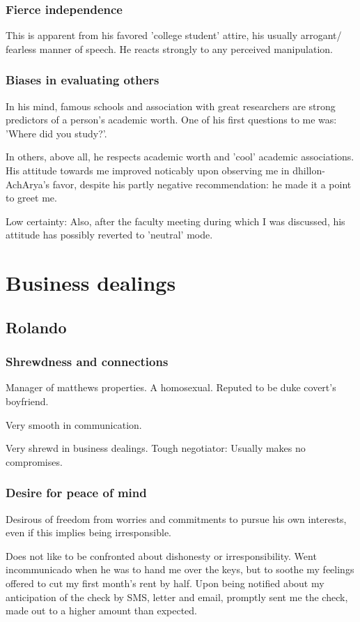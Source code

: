 \documentclass[oneside, article]{memoir}
\begin{document}
\section{Fierce independence}
This is apparent from his favored 'college student' attire, his usually arrogant/ fearless manner of speech. He reacts strongly to any perceived manipulation.

\section{Biases in evaluating others}
In his mind, famous schools and association with great researchers are strong predictors of a person's academic worth. One of his first questions to me was: 'Where did you study?'.

In others, above all, he respects academic worth and 'cool' academic associations. His attitude towards me improved noticably upon observing me in dhillon-AchArya's favor, despite his partly negative recommendation: he made it a point to greet me.

Low certainty: Also, after the faculty meeting during which I was discussed, his attitude has possibly reverted to 'neutral' mode.

\part{Business dealings}
\chapter{Rolando}
\section{Shrewdness and connections}
Manager of matthews properties. A homosexual. Reputed to be duke covert's boyfriend.

Very smooth in communication.

Very shrewd in business dealings. Tough negotiator: Usually makes no compromises.

\section{Desire for peace of mind}
Desirous of freedom from worries and commitments to pursue his own interests, even if this implies being irresponsible.

Does not like to be confronted about dishonesty or irresponsibility. Went incommunicado when he was to hand me over the keys, but to soothe my feelings offered to cut my first month's rent by half. Upon being notified about my anticipation of the check by SMS, letter and email, promptly sent me the check, made out to a higher amount than expected.
\end{document}
